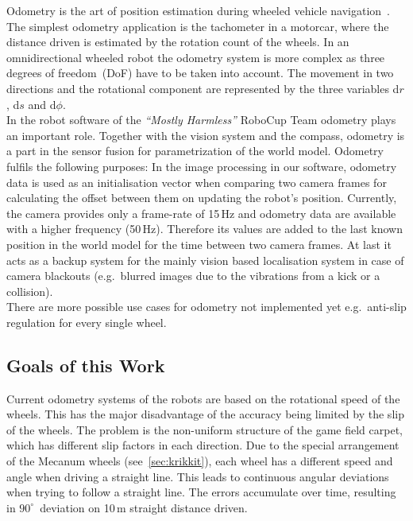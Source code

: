 \documentclass[12pt,a4paper]{article}
\newcommand{\MH}{\emph{``Mostly Harmless''} RoboCup Team\xspace}
\begin{document}

Odometry is the art of position estimation during wheeled vehicle navigation~\cite{webster}.
The simplest odometry application is the tachometer in a motorcar, where the distance driven is estimated by the rotation count of the wheels.
In an omnidirectional wheeled robot the odometry system is more complex as three degrees of freedom~(DoF) have to be taken into account.
The movement in two directions and the rotational component are represented by the three variables d$r$, d$s$ and d$\phi$.\\
In the robot software of the \MH odometry plays an important role.
Together with the vision system and the compass, odometry is a part in the sensor fusion for parametrization of the world model.
Odometry fulfils the following purposes:
In the image processing in our software, odometry data is used as an initialisation vector when comparing two camera frames for calculating the offset between them on updating the robot's position.
Currently, the camera provides only a frame-rate of 15\,Hz and odometry data are available with a higher frequency (50\,Hz).
Therefore its values are added to the last known position in the world model for the time between two camera frames.
At last it acts as a backup system for the mainly vision based localisation system in case of camera blackouts (e.g.\ blurred images due to the vibrations from a kick or a collision).\\
There are more possible use cases for odometry not implemented yet e.g.\ anti-slip regulation for every single wheel.

\subsection{Goals of this Work}
\label{motivation}
  
Current odometry systems of the robots are based on the rotational speed of the wheels.
This has the major disadvantage of the accuracy being limited by the slip of the wheels. 
The problem is the non-uniform structure of the game field carpet, which has different slip factors in each direction.
Due to the special arrangement of the Mecanum wheels (see~\autoref{sec:krikkit}), each wheel has a different speed and angle when driving a straight line.
This leads to continuous angular deviations when trying to follow a straight line.
The errors accumulate over time, resulting in $90^\circ$~deviation on 10\,m straight distance driven.
\end{document}
